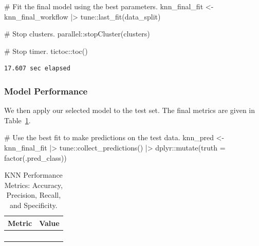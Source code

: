 \documentclass[
  letterpaper,
  DIV=11,
  numbers=noendperiod]{scrartcl}
\newenvironment{Shaded}{\begin{snugshade}}{\end{snugshade}}
\newcommand{\AttributeTok}[1]{\textcolor[rgb]{0.40,0.45,0.13}{#1}}
\newcommand{\CommentTok}[1]{\textcolor[rgb]{0.37,0.37,0.37}{#1}}
\newcommand{\FunctionTok}[1]{\textcolor[rgb]{0.28,0.35,0.67}{#1}}
\newcommand{\NormalTok}[1]{\textcolor[rgb]{0.00,0.23,0.31}{#1}}
\newcommand{\OtherTok}[1]{\textcolor[rgb]{0.00,0.23,0.31}{#1}}
\newcommand{\SpecialCharTok}[1]{\textcolor[rgb]{0.37,0.37,0.37}{#1}}
\begin{document}
\begin{Shaded}
\begin{Highlighting}[]
\CommentTok{\# Fit the final model using the best parameters.}
\NormalTok{knn\_final\_fit }\OtherTok{\textless{}{-}} 
\NormalTok{  knn\_final\_workflow }\SpecialCharTok{|\textgreater{}} 
\NormalTok{  tune}\SpecialCharTok{::}\FunctionTok{last\_fit}\NormalTok{(data\_split)}

\CommentTok{\# Stop clusters.}
\NormalTok{parallel}\SpecialCharTok{::}\FunctionTok{stopCluster}\NormalTok{(clusters)}

\CommentTok{\# Stop timer.}
\NormalTok{tictoc}\SpecialCharTok{::}\FunctionTok{toc}\NormalTok{()}
\end{Highlighting}
\end{Shaded}

\begin{verbatim}
17.607 sec elapsed
\end{verbatim}

\subsubsection{Model Performance}\label{model-performance}

We then apply our selected model to the test set. The final metrics are
given in Table~\ref{tbl-knn-performance-pdf}.

\begin{Shaded}
\begin{Highlighting}[]
\CommentTok{\# Use the best fit to make predictions on the test data.}
\NormalTok{knn\_pred }\OtherTok{\textless{}{-}} 
\NormalTok{  knn\_final\_fit }\SpecialCharTok{|\textgreater{}} 
\NormalTok{  tune}\SpecialCharTok{::}\FunctionTok{collect\_predictions}\NormalTok{() }\SpecialCharTok{|\textgreater{}}
\NormalTok{  dplyr}\SpecialCharTok{::}\FunctionTok{mutate}\NormalTok{(}\AttributeTok{truth =} \FunctionTok{factor}\NormalTok{(.pred\_class))}
\end{Highlighting}
\end{Shaded}

\begin{longtable}{>{\raggedright\arraybackslash}p{}>{\raggedleft\arraybackslash}p{}}

\caption{\label{tbl-knn-performance-pdf}KNN Performance Metrics:
Accuracy, Precision, Recall, and Specificity.}

\tabularnewline

\toprule
Metric & Value \\ 
\midrule\addlinespace[2.5pt]
\cellcolor[HTML]{FFFFFF}{Accuracy} & \cellcolor[HTML]{FFFFFF}{90.1} \\ 
\cellcolor[HTML]{FFFFFF}{Precision} & \cellcolor[HTML]{FFFFFF}{76.9} \\ 
\cellcolor[HTML]{FFFFFF}{Recall} & \cellcolor[HTML]{FFFFFF}{87.0} \\ 
\cellcolor[HTML]{FFFFFF}{Specificity} & \cellcolor[HTML]{FFFFFF}{91.2} \\ 
\bottomrule

\end{longtable}
\end{document}
